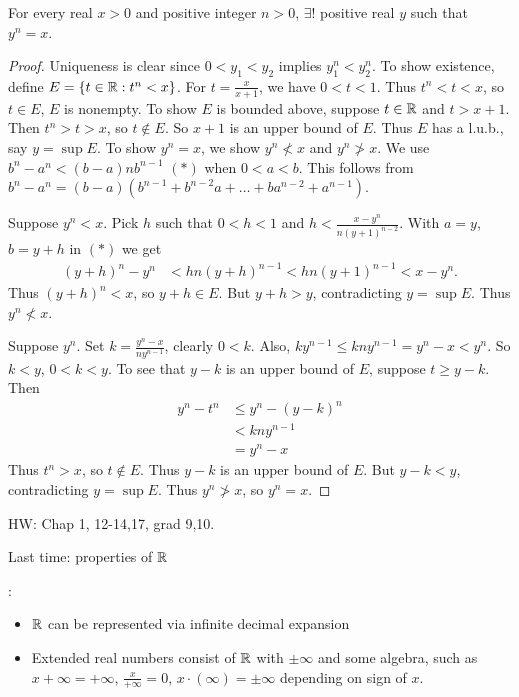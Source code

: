 \documentclass[]{article}
\begin{document}
\begin{theorem}
	For every real $x>0$ and positive integer $n>0$, $\exists!$ positive real $y$ such that $y^n=x$.
\end{theorem}
\begin{proof}
	Uniqueness is clear since $0<y_1<y_2$ implies $y_1^n<y_2^n$.
	To show existence, define $E=\left\{ t\in\mathbb{R} : t^n<x \right\}$.
	For $t=\frac x{x+1}$, we have $0<t<1$. Thus $t^n<t<x$, so $t\in E$, $E$ is nonempty.
	To show $E$ is bounded above, suppose $t\in\mathbb{R}$ and $t>x+1$.
	Then $t^n>t>x$, so $t\notin E$. So $x+1$ is an upper bound of $E$.
	Thus $E$ has a l.u.b., say $y=\sup E$. To show $y^n=x$, we show $y^n\nless x$ and $y^n\ngtr x$.
	We use $b^n-a^n<(b-a)nb^{n-1}$ $(*)$ when $0<a<b$. This follows from $b^n-a^n = (b-a)(b^{n-1}+b^{n-2}a+\dots+ba^{n-2}+a^{n-1})$.
	
	Suppose $y^n<x$. Pick $h$ such that $0<h<1$ and $h<\frac{x-y^n}{n(y+1)^{n-2}}$.
	With $a=y$, $b=y+h$ in $(*)$ we get
	\begin{align*}
		(y+h)^n - y^n &< hn(y+h)^{n-1} < hn(y+1)^{n-1} < x-y^n.
	\end{align*}
	Thus $(y+h)^n<x$, so $y+h\in E$. But $y+h>y$, contradicting $y=\sup E$.
	Thus $y^n\nless x$.

	Suppose $y^n$. Set $k = \frac{y^n-x}{ny^{n-1}}$, clearly $0<k$.
	Also, $ky^{n-1} \leq kny^{n-1} = y^n-x < y^n$. So $k<y$, $0<k<y$.
	To see that $y-k$ is an upper bound of $E$, suppose $t\geq y-k$. Then
	\begin{align*}
		y^n-t^n &\leq y^n-(y-k)^n \\
				&< kny^{n-1} \\
				&= y^n-x
	\end{align*}
	Thus $t^n>x$, so $t\notin E$. Thus $y-k$ is an upper bound of $E$.
	But $y-k<y$, contradicting $y=\sup E$. Thus $y^n\ngtr x$, so $y^n=x$.
\end{proof}

HW: Chap 1, 12-14,17, grad 9,10.

Last time: properties of $\mathbb{R}$

\begin{note}:
	\begin{itemize}
		\item $\mathbb{R}$ can be represented via infinite decimal expansion
		\item Extended real numbers consist of $\mathbb{R}$ with $\pm\infty$ and some algebra, such as $x+\infty=+\infty$, $\frac x{+\infty}=0$, $x\cdot(\infty) = \pm\infty$ depending on sign of $x$.
	\end{itemize}
\end{note}
\end{document}
